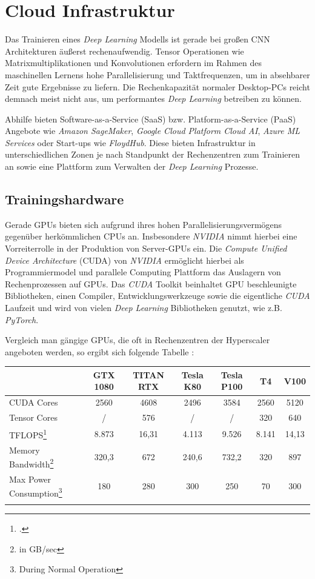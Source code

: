 \section{Cloud Infrastruktur}

Das Trainieren eines \textit{Deep Learning} Modells ist gerade bei großen CNN Architekturen äußerst rechenaufwendig. Tensor Operationen wie Matrixmultiplikationen und Konvolutionen erfordern im Rahmen des maschinellen Lernens hohe Parallelisierung und Taktfrequenzen, um in absehbarer Zeit gute Ergebnisse zu liefern. Die Rechenkapazität normaler Desktop-PCs reicht demnach meist nicht aus, um performantes \textit{Deep Learning} betreiben zu können. 

Abhilfe bieten Software-as-a-Service (SaaS) bzw. Platform-as-a-Service (PaaS) Angebote wie \textit{Amazon SageMaker}, \textit{Google Cloud Platform Cloud AI}, \textit{Azure ML Services} oder Start-ups wie \textit{FloydHub}. Diese bieten Infrastruktur in unterschiedlichen Zonen je nach Standpunkt der Rechenzentren zum Trainieren an sowie eine Plattform zum Verwalten der \textit{Deep Learning} Prozesse. 

\subsection{Trainingshardware}

Gerade GPUs bieten sich aufgrund ihres hohen Parallelisierungsvermögens gegenüber herkömmlichen CPUs an. Insbesondere \textit{NVIDIA} nimmt hierbei eine Vorreiterrolle in der Produktion von Server-GPUs ein. Die \textit{Compute Unified Device Architecture} (CUDA) von \textit{NVIDIA} ermöglicht hierbei als Programmiermodel und parallele Computing Plattform das Auslagern von Rechenprozessen auf GPUs. Das \textit{CUDA} Toolkit beinhaltet GPU beschleunigte Bibliotheken, einen Compiler, Entwicklungswerkzeuge sowie die eigentliche \textit{CUDA} Laufzeit und wird von vielen \textit{Deep Learning} Bibliotheken genutzt, wie z.B. \textit{PyTorch}. \cite{NVIDIA.20200209} \cite{PyTorch.20200209}

Vergleich man gängige GPUs, die oft in Rechenzentren der Hyperscaler angeboten werden, so ergibt sich folgende Tabelle \cite{TechPowerUp.20200209}:

\begin{tabular}[h]{l|c|c|c|c|c|c}
	& GTX 1080 & TITAN RTX & Tesla K80 & Tesla P100 & T4 & V100 \\
	\hline
	CUDA Cores & 2560 & 4608 & 2496 & 3584 & 2560 & 5120 \\
	Tensor Cores & / & 576 & / & / & 320 & 640 \\
	TFLOPS\footcite{Single Precision} & 8.873 & 16,31 & 4.113 & 9.526 & 8.141 & 14,13 \\
	Memory Bandwidth\footnote{in GB/sec} & 320,3 & 672 & 240,6 & 732,2 & 320 & 897 \\
	Max Power Consumption\footnote{During Normal Operation} & 180 & 280 & 300 & 250 & 70 & 300 \\
	\label{gpus}
\end{tabular}

